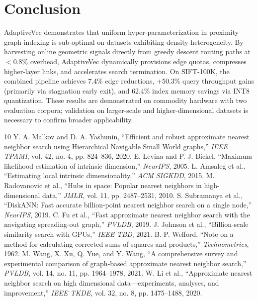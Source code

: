 \documentclass[conference,10pt]{IEEEtran}
\begin{document}
\section{Conclusion}
AdaptiveVec demonstrates that uniform hyper-parameterization in proximity graph indexing is sub-optimal on datasets exhibiting density heterogeneity. By harvesting online geometric signals directly from greedy descent routing paths at $<0.8\%$ overhead, AdaptiveVec dynamically provisions edge quotas, compresses higher-layer links, and accelerates search termination. On SIFT-100K, the combined pipeline achieves 7.4\% edge reductions, +50.3\% query throughput gains (primarily via stagnation early exit), and 62.4\% index memory savings via INT8 quantization. These results are demonstrated on commodity hardware with two evaluation corpora; validation on larger-scale and higher-dimensional datasets is necessary to confirm broader applicability.

\begin{thebibliography}{10}
 Y. A. Malkov and D. A. Yashunin, ``Efficient and robust approximate nearest neighbor search using Hierarchical Navigable Small World graphs,'' \textit{IEEE TPAMI}, vol. 42, no. 4, pp. 824--836, 2020.
 E. Levina and P. J. Bickel, ``Maximum likelihood estimation of intrinsic dimension,'' \textit{NeurIPS}, 2005.
 L. Amsaleg et al., ``Estimating local intrinsic dimensionality,'' \textit{ACM SIGKDD}, 2015.
 M. Radovanovic et al., ``Hubs in space: Popular nearest neighbors in high-dimensional data,'' \textit{JMLR}, vol. 11, pp. 2487--2531, 2010.
 S. Subramanya et al., ``DiskANN: Fast accurate billion-point nearest neighbor search on a single node,'' \textit{NeurIPS}, 2019.
 C. Fu et al., ``Fast approximate nearest neighbor search with the navigating spreading-out graph,'' \textit{PVLDB}, 2019.
 J. Johnson et al., ``Billion-scale similarity search with GPUs,'' \textit{IEEE TBD}, 2021.
 B. P. Welford, ``Note on a method for calculating corrected sums of squares and products,'' \textit{Technometrics}, 1962.
 M. Wang, X. Xu, Q. Yue, and Y. Wang, ``A comprehensive survey and experimental comparison of graph-based approximate nearest neighbor search,'' \textit{PVLDB}, vol. 14, no. 11, pp. 1964--1978, 2021.
 W. Li et al., ``Approximate nearest neighbor search on high dimensional data---experiments, analyses, and improvement,'' \textit{IEEE TKDE}, vol. 32, no. 8, pp. 1475--1488, 2020.
\end{thebibliography}
\end{document}

